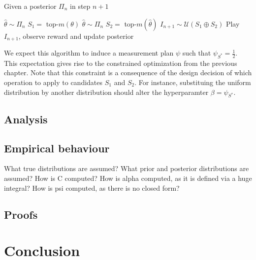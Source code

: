 \begin{algorithm}[H]
  \caption{Given a posterior $\Pi_n$ in step $n+1$}
  \label{alg:TXTS}
  \begin{algorithmic}
    \State $\hat{\theta} \sim \Pi_n$
    \State $S_1 =$ top-$m(\theta)$
    \Repeat
      \State $\hat{\theta} \sim \Pi_n$
      \State $S_2 = $ top-$m(\hat{\theta})$
    \State $I_{n+1} \sim \mathcal{U}(S_1 \oplus S_2)$
    \State Play $I_{n+1}$, observe reward and update posterior
  \end{algorithmic}
\end{algorithm}

We expect this algorithm to induce a measurement plan $\psi$ such that $\psi_{S^*} = \frac{1}{2}$. This expectation gives rise to the constrained optimization from the previous chapter. Note that this constraint is a consequence of the design decision of which operation to apply to candidates $S_1$ and $S_2$. For instance, substituing the uniform distribution by another distribution should alter the hyperparamter $\beta = \psi_{S^*}$.

\section{Analysis}\label{section:analysis}
\section{Empirical behaviour}\label{section:empirical_behaviour}
What true distributions are assumed?
What prior and posterior distributions are assumed?
How is C computed?
How is alpha computed, as it is defined via a huge integral?
How is psi computed, as there is no closed form?
\section{Proofs}\label{section:txts_proofs}

\chapter{Conclusion}
